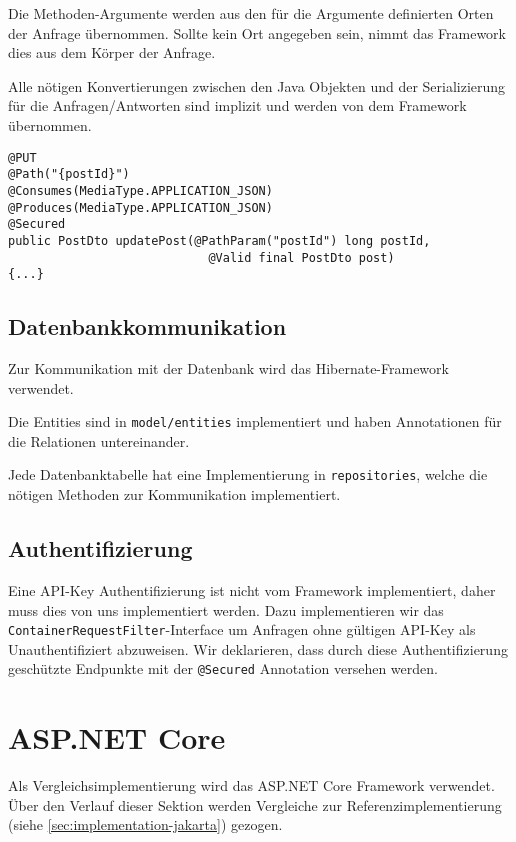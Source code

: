 Die Methoden-Argumente werden aus den für die Argumente definierten Orten der Anfrage übernommen. Sollte kein Ort angegeben sein, nimmt das Framework dies aus dem Körper der Anfrage.

Alle nötigen Konvertierungen zwischen den Java Objekten und der Serializierung für die Anfragen/Antworten sind implizit und werden von dem Framework übernommen.

\begin{lstlisting}[style=Java, caption={PUT /posts/\{id\} - Deklaration}]
@PUT
@Path("{postId}")
@Consumes(MediaType.APPLICATION_JSON)
@Produces(MediaType.APPLICATION_JSON)
@Secured
public PostDto updatePost(@PathParam("postId") long postId,
                            @Valid final PostDto post)
{...}
\end{lstlisting}

\subsection{Datenbankkommunikation}

Zur Kommunikation mit der Datenbank wird das Hibernate-Framework verwendet.

Die Entities sind in \texttt{model/entities} implementiert und haben Annotationen für die Relationen untereinander.

Jede Datenbanktabelle hat eine Implementierung in \texttt{repositories}, welche die nötigen Methoden zur Kommunikation implementiert.

\subsection{Authentifizierung}

Eine API-Key Authentifizierung ist nicht vom Framework implementiert, daher muss dies von uns implementiert werden.
Dazu implementieren wir das \texttt{ContainerRequestFilter}-Interface um Anfragen ohne gültigen API-Key als Unauthentifiziert abzuweisen.
Wir deklarieren, dass durch diese Authentifizierung geschützte Endpunkte mit der \texttt{@Secured} Annotation versehen werden.



\section{ASP.NET Core}
\label{sec:implementation-aspnetcore}
Als Vergleichsimplementierung wird das ASP.NET Core Framework verwendet. 
\\
Über den Verlauf dieser Sektion werden Vergleiche zur Referenzimplementierung (siehe \ref{sec:implementation-jakarta}) gezogen.

